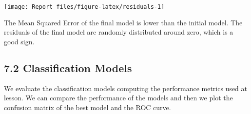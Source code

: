 \documentclass[
]{article}
\begin{document}
\begin{center}\texttt{[image: Report\_files/figure-latex/residuals-1]} \end{center}

The Mean Squared Error of the final model is lower than the initial
model. The residuals of the final model are randomly distributed around
zero, which is a good sign.

\hypertarget{classification-models}{%
\subsection{7.2 Classification Models}\label{classification-models}}

We evaluate the classification models computing the performance metrics
used at lesson. We can compare the performance of the models and then we
plot the confusion matrix of the best model and the ROC curve.
\end{document}
